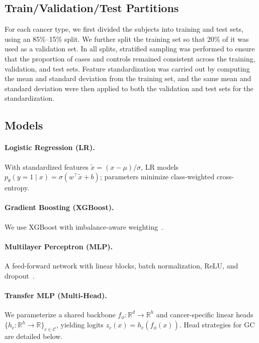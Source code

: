\documentclass[journal,article,submit,pdftex,moreauthors]{Definitions/mdpi}
\begin{document}
\subsection{Train/Validation/Test Partitions}
For each cancer type, we first divided the subjects into training and test sets, using an 85\%--15\% split. 
We further split the training set so that 20\% of it was used as a validation set. 
In all splits, stratified sampling was performed to ensure that the proportion of cases and controls remained consistent across the training, validation, and test sets. 
Feature standardization was carried out by computing the mean and standard deviation from the training set, and the same mean and standard deviation were then applied to both the validation and test sets for the standardization.


\subsection{Models}

\paragraph{Logistic Regression (LR).} With standardized features $\tilde{x}=(x-\mu)/\sigma$, LR models $p_\theta(y = 1\mid x)=\sigma(w^\top \tilde{x}+b)$; parameters minimize class-weighted cross-entropy.

\paragraph{Gradient Boosting (XGBoost).} We use XGBoost with imbalance-aware weighting~\citep{Chen2016_XGBoost}.

\paragraph{Multilayer Perceptron (MLP).} A feed-forward network with linear blocks, batch normalization, ReLU, and dropout~\citep{Ioffe2015_BN,Srivastava2014_Dropout}.

\paragraph{Transfer MLP (Multi-Head).}
We parameterize a shared backbone $f_\phi:\mathbb{R}^d\!\to\!\mathbb{R}^h$ and cancer-specific linear heads $\{h_c:\mathbb{R}^h\!\to\!\mathbb{R}\}_{c\in\mathcal{C}}$, yielding logits $z_c(x)=h_c(f_\phi(x))$. Head strategies for GC are detailed below.
\end{document}
